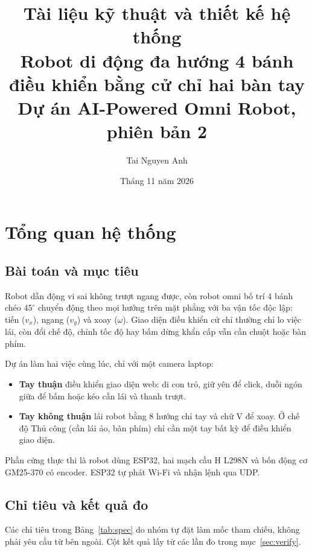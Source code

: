 \documentclass[11pt,a4paper]{article}
\title{\textbf{Tài liệu kỹ thuật và thiết kế hệ thống}\\[4pt]
\large Robot di động đa hướng 4 bánh điều khiển bằng cử chỉ hai bàn tay\\
\normalsize Dự án AI-Powered Omni Robot, phiên bản 2}
\author{Tai Nguyen Anh}
\date{Tháng 11 năm 2026}
\begin{document}
\maketitle
\tableofcontents
\newpage

\section{Tổng quan hệ thống}
\subsection{Bài toán và mục tiêu}
Robot dẫn động vi sai không trượt ngang được, còn robot omni bố trí 4 bánh chéo $45^\circ$ chuyển động theo mọi hướng trên mặt phẳng với ba vận tốc độc lập: tiến ($v_x$), ngang ($v_y$) và xoay ($\omega$). Giao diện điều khiển cử chỉ thường chỉ lo việc lái, còn đổi chế độ, chỉnh tốc độ hay bấm dừng khẩn cấp vẫn cần chuột hoặc bàn phím.

Dự án làm hai việc cùng lúc, chỉ với một camera laptop:
\begin{itemize}
  \item \textbf{Tay thuận} điều khiển giao diện web: di con trỏ, giữ yên để click, duỗi ngón giữa để bấm hoặc kéo cần lái và thanh trượt.
  \item \textbf{Tay không thuận} lái robot bằng 8 hướng chỉ tay và chữ V để xoay. Ở chế độ Thủ công (cần lái ảo, bàn phím) chỉ cần một tay bất kỳ để điều khiển giao diện.
\end{itemize}
Phần cứng thực thi là robot dùng ESP32, hai mạch cầu H L298N và bốn động cơ GM25-370 có encoder. ESP32 tự phát Wi-Fi và nhận lệnh qua UDP.

\subsection{Chỉ tiêu và kết quả đo}
Các chỉ tiêu trong Bảng~\ref{tab:spec} do nhóm tự đặt làm mốc tham chiếu, không phải yêu cầu từ bên ngoài. Cột kết quả lấy từ các lần đo trong mục~\ref{sec:verify}.
\end{document}
